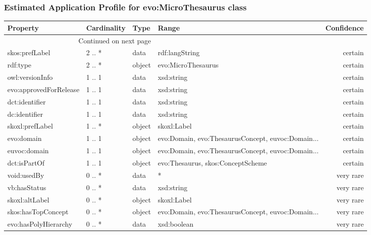 \documentclass[10pt,a4paper,titlepage,final]{article}
\begin{document}
\subsubsection{Estimated Application Profile for evo:MicroThesaurus class}
\begin{tabularx}{\textwidth}{lllXr}
\toprule
               Property & Cardinality &    Type &                                              Range & Confidence \\
\midrule
\endhead
\midrule
\multicolumn{3}{r}{{Continued on next page}} \\
\midrule
\endfoot

\bottomrule
\endlastfoot
         skos:prefLabel &      2 .. * &    data &                                     rdf:langString &    certain \\
               rdf:type &      2 .. * &  object &                                 evo:MicroThesaurus &    certain \\
        owl:versionInfo &      1 .. 1 &    data &                                         xsd:string &    certain \\
 evo:approvedForRelease &      1 .. 1 &    data &                                         xsd:string &    certain \\
         dct:identifier &      1 .. 1 &    data &                                         xsd:string &    certain \\
          dc:identifier &      1 .. 1 &    data &                                         xsd:string &    certain \\
        skoxl:prefLabel &      1 .. * &  object &                                        skoxl:Label &    certain \\
             evo:domain &      1 .. 1 &  object &  evo:Domain, evo:ThesaurusConcept, euvoc:Domain... &    certain \\
           euvoc:domain &      1 .. 1 &  object &  evo:Domain, evo:ThesaurusConcept, euvoc:Domain... &    certain \\
           dct:isPartOf &      1 .. 1 &  object &                  evo:Thesaurus, skos:ConceptScheme &    certain \\
            void:usedBy &      0 .. * &    data &                                                  * &  very rare \\
           vb:hasStatus &      0 .. * &    data &                                         xsd:string &  very rare \\
         skoxl:altLabel &      0 .. * &  object &                                        skoxl:Label &  very rare \\
     skos:hasTopConcept &      0 .. * &  object &  evo:Domain, evo:ThesaurusConcept, euvoc:Domain... &  very rare \\
   evo:hasPolyHierarchy &      0 .. * &    data &                                        xsd:boolean &  very rare \\
\end{tabularx}
\end{document}
